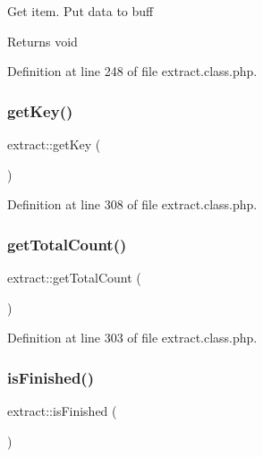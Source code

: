 Get item. Put data to buff \begin{DoxyReturn}{Returns}
void 
\end{DoxyReturn}


Definition at line 248 of file extract.\+class.\+php.

\mbox{\label{classextract_a0737ef550d78c7a4441e196e7459bf8c}} 
\subsubsection{\texorpdfstring{get\+Key()}{getKey()}}
{\footnotesize\ttfamily extract\+::get\+Key (\begin{DoxyParamCaption}{ }\end{DoxyParamCaption})}



Definition at line 308 of file extract.\+class.\+php.

\mbox{\label{classextract_a5a9d910ed0ef78b9b8bb2631066949e7}} 
\subsubsection{\texorpdfstring{get\+Total\+Count()}{getTotalCount()}}
{\footnotesize\ttfamily extract\+::get\+Total\+Count (\begin{DoxyParamCaption}{ }\end{DoxyParamCaption})}



Definition at line 303 of file extract.\+class.\+php.

\mbox{\label{classextract_a02b3463a94c24f1f63c4a68bacc86607}} 
\subsubsection{\texorpdfstring{is\+Finished()}{isFinished()}}
{\footnotesize\ttfamily extract\+::is\+Finished (\begin{DoxyParamCaption}{ }\end{DoxyParamCaption})}



